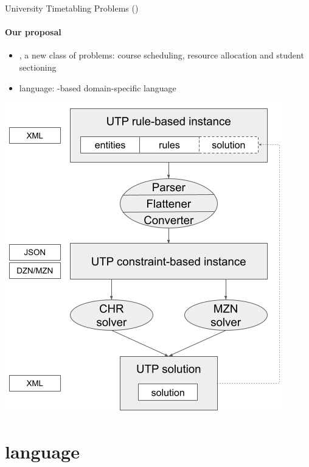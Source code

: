 \documentclass{beamer}
\begin{document}
\begin{frame}{University Timetabling Problems (\UTP{})}
\framesubtitle{Our proposal}
\begin{minipage}{.43\textwidth}
    \begin{itemize}
        \item \UTP{}, a new class of problems: course scheduling, resource allocation and student sectioning
        \item \UTP{} language: \XML{}-based domain-specific language
    \end{itemize}
\end{minipage}
\hfill
\begin{minipage}{.55\textwidth}
\begin{center}
    \includegraphics[scale=.38]{img/utp_toolchain.png}
\end{center}
\end{minipage}
\end{frame}

\section{\UTP{} language}
\end{document}
